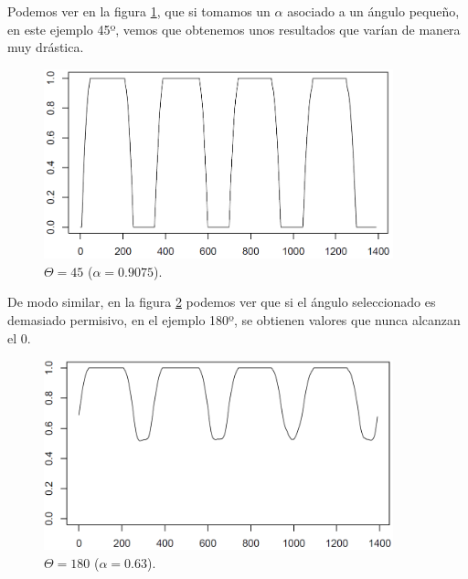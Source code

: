 Podemos ver en la figura \ref{fig6}, que si tomamos un $\alpha$ asociado a un ángulo pequeño, en este ejemplo 45º, vemos que obtenemos unos resultados que varían de manera muy drástica.

\begin{figure}[H]
\begin{center}

\includegraphics[width=0.9\textwidth]{img/lin-dev3-1-limpio-09075.png}
\end{center}

\caption{$\Theta = 45$ ($\alpha = 0.9075$).}
\label{fig6}
\end{figure}

De modo similar, en la figura \ref{fig7} podemos ver que si el ángulo seleccionado es demasiado permisivo, en el ejemplo 180º, se obtienen valores que nunca alcanzan el 0.\\

\begin{figure}[H]
\begin{center}

\includegraphics[width=0.9\textwidth]{img/lin-dev3-1-limpio-063.png}
\end{center}

\caption{$\Theta = 180$ ($\alpha = 0.63$).}
\label{fig7}
\end{figure}

